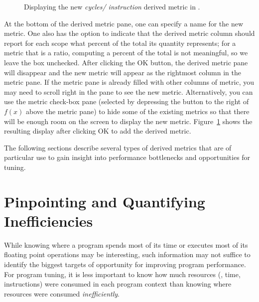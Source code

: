 \documentclass[11pt,letterpaper]{report}
\begin{document}
\begin{figure}[t]
\caption{Displaying the new {\em cycles/ instruction} derived metric in \hpcviewer{}.}
\label{fig:cycles-per-inst-2}
\end{figure}

At the bottom of the derived metric pane, one can specify a name for the new metric.
One also has the option to indicate that the derived metric column should report for each scope what percent of the total its quantity represents; for a metric that is a ratio, computing a percent of the total is not meaningful, so we leave the box unchecked.
After clicking the OK button, the derived metric pane will disappear and the new metric will appear as the rightmost column in the metric pane.
If the metric pane is already filled with other columns of metric, you may need to scroll right in the pane to see the new metric.
Alternatively, you can use the metric check-box pane (selected by depressing the button to the right of $f(x)$ above the metric pane) to hide some of the existing metrics so that there will be enough room on the screen to display the new metric.
Figure~\ref{fig:cycles-per-inst-2} shows the resulting \hpcviewer{} display after clicking OK to add the derived metric.

The following sections describe several types of derived metrics that are of particular use to gain insight into performance bottlenecks and opportunities for tuning.


\section{Pinpointing and Quantifying Inefficiencies}
\label{sec:effective-performance-analysis:inefficiencies}

While knowing where a program spends most of its time or executes most of its floating point operations may be interesting, such information may not suffice to identify the biggest targets of opportunity for improving program performance.
For program tuning, it is less important to know how much resources (\eg, time, instructions) were consumed in each program context than knowing where resources were consumed {\em inefficiently}.
\end{document}
